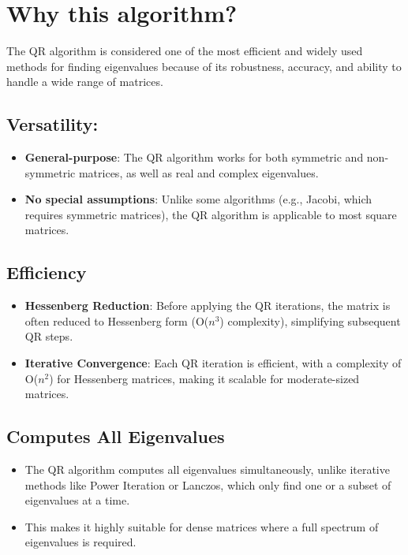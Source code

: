 \documentclass{article}
\begin{document}
\section{Why this algorithm?}
The QR algorithm is considered one of the most efficient and widely used methods for finding eigenvalues because of its robustness, accuracy, and ability to handle a wide range of matrices. 
\subsection{Versatility:}
\begin{itemize}
    \item \textbf{General-purpose}: The QR algorithm works for both symmetric and non-symmetric matrices, as well as real and complex eigenvalues.
    \item \textbf{No special assumptions}: Unlike some algorithms (e.g., Jacobi, which requires symmetric matrices), the QR algorithm is applicable to most square matrices.
\end{itemize}
\subsection{Efficiency}
\begin{itemize}
    \item  \textbf{Hessenberg Reduction}: Before applying the QR iterations, the matrix is often reduced to Hessenberg form (O($n^3$) complexity), simplifying subsequent QR steps.
    \item \textbf{Iterative Convergence}: Each QR iteration is efficient, with a complexity of O($n^2$) for Hessenberg matrices, making it scalable for moderate-sized matrices.
\end{itemize}
\subsection{Computes All Eigenvalues}
\begin{itemize}
    \item  The QR algorithm computes all eigenvalues simultaneously, unlike iterative methods like Power Iteration or Lanczos, which only find one or a subset of eigenvalues at a time.
    \item This makes it highly suitable for dense matrices where a full spectrum of eigenvalues is required.
\end{itemize}   
\end{document}
